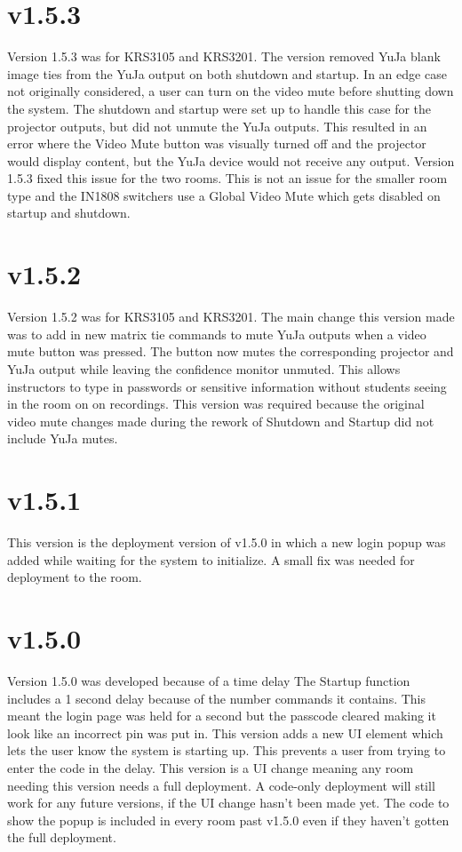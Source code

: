 \documentclass{article}
\begin{document}
\section*{v1.5.3}

Version 1.5.3 was for KRS3105 and KRS3201. The version removed YuJa blank image ties from the YuJa output on both shutdown and
startup. In an edge case not originally considered, a user can turn on the video mute before shutting down the system. The 
shutdown and startup were set up to handle this case for the projector outputs, but did not unmute the YuJa outputs. 
This resulted in an error where the Video Mute button was visually turned off and the projector would display content, but the 
YuJa device would not receive any output. Version 1.5.3 fixed this issue for the two rooms. This is not an issue for the smaller 
room type and the IN1808 switchers use a Global Video Mute which gets disabled on startup and shutdown. 

\section*{v1.5.2}

Version 1.5.2 was for KRS3105 and KRS3201. The main change this version made was to add in new matrix tie commands to mute 
YuJa outputs when a video mute button was pressed. The button now mutes the corresponding projector and YuJa output while 
leaving the confidence monitor unmuted. This allows instructors to type in passwords or sensitive information without
students seeing in the room on on recordings. This version was required because the original video mute changes made during 
the rework of Shutdown and Startup did not include YuJa mutes. 

\section*{v1.5.1}

This version is the deployment version of v1.5.0 in which a new login popup was added while waiting for the system to initialize.
A small fix was needed for deployment to the room.  

\section*{v1.5.0}

Version 1.5.0 was developed because of a time delay
The Startup function includes a 1 second delay because of the number commands it contains. This meant the login page was held 
for a second but the passcode cleared making it look like an incorrect pin was put in. This version adds a new UI element which 
lets the user know the system is starting up. This prevents a user from trying to enter the code in the delay. This version is 
a UI change meaning any room needing this version needs a full deployment. A code-only deployment will still work for any future
versions, if the UI change hasn't been made yet. The code to show the popup is included in every room past v1.5.0 even if they 
haven't gotten the full deployment. 
\end{document}
